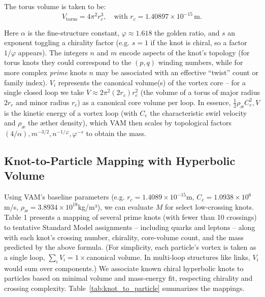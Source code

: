 The torus volume is taken to be:
\[
V_{\text{torus}} = 4\pi^2 r_c^3,
\quad \text{with } r_c = 1.40897 \times 10^{-15}\, \text{m}.
\]


Here $\alpha$ is the fine-structure constant, $\varphi\approx1.618$ the golden ratio, and $s$ an exponent toggling a chirality factor (e.g. $s=1$ if the knot is chiral, so a factor $1/\varphi$ appears). The integers $n$ and $m$ encode aspects of the knot’s topology (for torus knots they could correspond to the $(p,q)$ winding numbers, while for more complex \textit{prime} knots $n$ may be associated with an effective “twist” count or family index).  ${V_i}$ represents the canonical volume(s) of the vortex core – for a single closed loop we take $V\approx 2\pi^2(2r_c)r_c^2$ (the volume of a torus of major radius $2r_c$ and minor radius $r_c$) as a canonical core volume per loop. In essence, $\frac{1}{2}\rho_{æ}C_e^2,V$ is the kinetic energy of a vortex loop (with $C_e$ the characteristic swirl velocity and $\rho_{æ}$ the æther density), which VAM then scales by topological factors $(4/\alpha),m^{-3/2},n^{-1/\varphi},\varphi^{-s}$ to obtain the mass.






\subsection{Knot-to-Particle Mapping with Hyperbolic Volume}
Using VAM’s baseline parameters (e.g. $r_c=1.4089\times10^{-15}$m, $C_e=1.0938\times10^6$m/s, $\rho_{æ}=3.8934\times10^{18}$kg/m³), we can evaluate $M$ for select low-crossing knots. Table 1 presents a mapping of several prime knots (with fewer than 10 crossings) to tentative Standard Model assignments – including quarks and leptons – along with each knot’s crossing number, chirality, core-volume count, and the mass predicted by the above formula. (For simplicity, each particle’s vortex is taken as a single loop, $\sum_i V_i=1\times$canonical volume. In multi-loop structures like links, $V_i$ would sum over components.)
We associate known chiral hyperbolic knots to particles based on minimal volume and mass-energy fit, respecting chirality and crossing complexity. Table~\ref{tab:knot_to_particle} summarizes the mappings.

